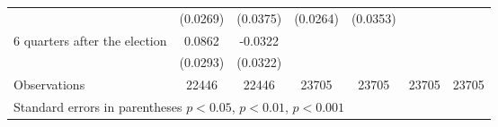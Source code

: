 \begin{table}[!ht]
\begin{tabular}{l*{6}{c}}
                    &    (0.0269)         &    (0.0375)         &    (0.0264)         &    (0.0353)         &                     &                     \\
[0,12em]
 6 quarters after the election&      0.0862\sym{**} &     -0.0322         &                     &                     &                     &                     \\
                    &    (0.0293)         &    (0.0322)         &                     &                     &                     &                     \\
\hline
Observations        &       22446         &       22446         &       23705         &       23705         &       23705         &       23705         \\
\hline\hline
\multicolumn{7}{l}{ Standard errors in parentheses \sym{*} \(p<0.05\), \sym{**} \(p<0.01\), \sym{***} \(p<0.001\)}\\\end{tabular}
\end{table}

